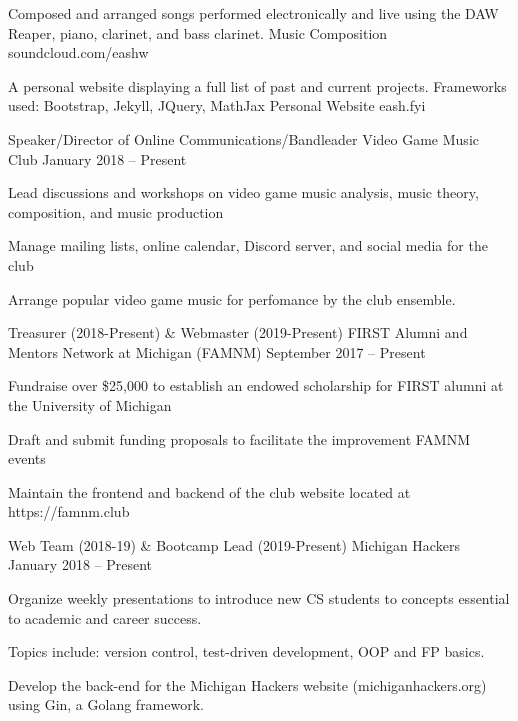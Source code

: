 \documentclass[]{awesome-cv}
\begin{document}
	\vspace{-6mm}
	\cventry
	{Composed and arranged songs performed electronically and live using the DAW Reaper, piano, clarinet, and bass clarinet.}
	{Music Composition}
	{soundcloud.com/eashw}
	{}
	{}
	
	\vspace{-6mm}
	\cventry
	{A personal website displaying a full list of past and current projects. Frameworks used: Bootstrap, Jekyll, JQuery, MathJax}
	{Personal Website}
	{eash.fyi}
	{}
	{}
	
	\vspace{-5mm}

\vspace{-2mm}
\vspace{-2mm}
	\cventry
	{Speaker/Director of Online Communications/Bandleader}
	{Video Game Music Club}
	{}
	{January 2018 – Present}
	{\begin{cvitems}
		\item {Lead discussions and workshops on video game music analysis, music theory, composition, and music production}
		\item {Manage mailing lists, online calendar, Discord server, and social media for the club}
		\item {Arrange popular video game music for perfomance by the club ensemble.}
		\end{cvitems}}

	\vspace{-4mm}
	\cventry
	{Treasurer (2018-Present) \& Webmaster (2019-Present)}
	{FIRST Alumni and Mentors Network at Michigan (FAMNM)}
	{}
	{September 2017 – Present}
	{\begin{cvitems}
		\item {Fundraise over \$25,000 to establish an endowed scholarship for FIRST alumni at the University of Michigan}
		\item {Draft and submit funding proposals to facilitate the improvement FAMNM events}
		\item {Maintain the frontend and backend of the club website located at https://famnm.club}
		\end{cvitems}}
	
	\vspace{-4mm}
	\cventry
	{Web Team (2018-19) \& Bootcamp Lead (2019-Present)}
	{Michigan Hackers}
	{}
	{January 2018 – Present}
	{\begin{cvitems}
		\item {Organize weekly presentations to introduce new CS students to concepts essential to academic and career success.}
		\item {Topics include: version control, test-driven development, OOP and FP basics.}
		\item {Develop the back-end for the Michigan Hackers website (michiganhackers.org) using Gin, a Golang framework.}
		\end{cvitems}}
	\vspace{-4mm}
\end{document}
